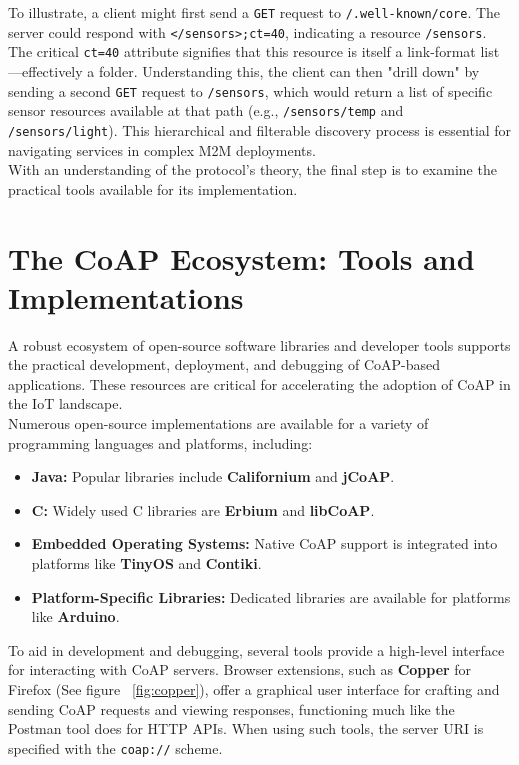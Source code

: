 \documentclass{scrbook}
\begin{document}
To illustrate, a client might first send a \texttt{GET} request to \texttt{/.well-known/core}. The server could respond with \texttt{</sensors>;ct=40}, indicating a resource \texttt{/sensors}. The critical \texttt{ct=40} attribute signifies that this resource is itself a link-format list—effectively a folder. Understanding this, the client can then "drill down" by sending a second \texttt{GET} request to \texttt{/sensors}, which would return a list of specific sensor resources available at that path (e.g., \texttt{/sensors/temp} and \texttt{/sensors/light}). This hierarchical and filterable discovery process is essential for navigating services in complex M2M deployments. \\

With an understanding of the protocol's theory, the final step is to examine the practical tools available for its implementation.

\chapter{The CoAP Ecosystem: Tools and Implementations}

A robust ecosystem of open-source software libraries and developer tools supports the practical development, deployment, and debugging of CoAP-based applications. These resources are critical for accelerating the adoption of CoAP in the IoT landscape. \\

Numerous open-source implementations are available for a variety of programming languages and platforms, including:

\begin{itemize}
    \item \textbf{Java:} Popular libraries include \textbf{Californium} and \textbf{jCoAP}.
    \item \textbf{C:} Widely used C libraries are \textbf{Erbium} and \textbf{libCoAP}.
    \item \textbf{Embedded Operating Systems:} Native CoAP support is integrated into platforms like \textbf{TinyOS} and \textbf{Contiki}.
    \item \textbf{Platform-Specific Libraries:} Dedicated libraries are available for platforms like \textbf{Arduino}.
\end{itemize}

To aid in development and debugging, several tools provide a high-level interface for interacting with CoAP servers. Browser extensions, such as \textbf{Copper} for Firefox (See figure ~\ref{fig:copper}), offer a graphical user interface for crafting and sending CoAP requests and viewing responses, functioning much like the Postman tool does for HTTP APIs. When using such tools, the server URI is specified with the \texttt{coap://} scheme. \\
\end{document}
